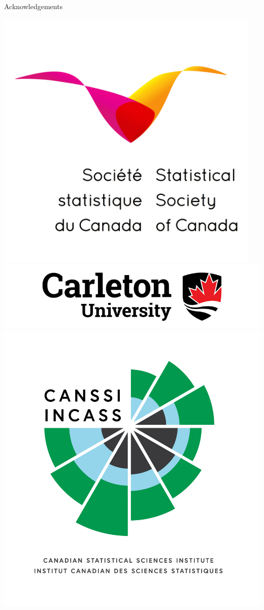 \documentclass[final]{beamer}
\newlength{\onecolwid}
\begin{document}
\begin{frame}[t]
\begin{columns}[t]
\begin{column}{\onecolwid}
\begin{block}{Acknowledgements}
\begin{center}
					\includegraphics[width=5in]{SSC.png}
					\includegraphics[width=7in]{carleton.jpg}
					\includegraphics[width=7in]{CANSSI_Logo-tag-stacked.jpg}

\end{center}
\end{block}
\end{column}
\end{columns}
\end{frame}
\end{document}
